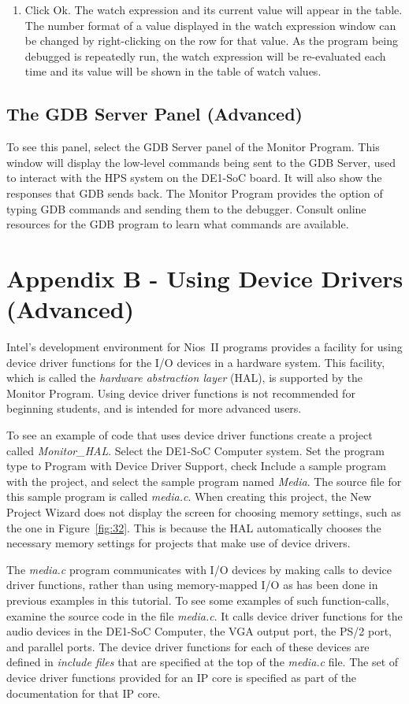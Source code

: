 \documentclass[11pt, twoside, pdftex]{article}
\begin{document}
\begin{enumerate}
\item Click \textsf{Ok}. The watch expression and its current
value will appear in the table. The number format of a value
displayed in the watch expression window can be changed by
right-clicking on the row for that value.  
As the program being debugged is repeatedly run, 
the watch expression will be re-evaluated each time and its value
will be shown in the table of watch values.
\end{enumerate}

\subsection{The GDB Server Panel (Advanced)}
To see this panel, select the {\sf GDB Server} panel of the
Monitor Program. This window will display the low-level commands
being sent to the GDB Server, used to interact with the HPS
system on the DE1-SoC board. It will also show the responses that GDB sends back. The Monitor Program provides the option
of typing GDB commands and sending them to the debugger. 
Consult online resources for the GDB program to learn what
commands are available.

\newpage
\section{Appendix B - Using Device Drivers (Advanced)}
Intel's development environment for Nios~II programs provides a
facility for using device driver functions for the I/O devices in
a hardware system. This facility, which is called the
{\it hardware abstraction layer} (HAL), is supported by the
Monitor Program. Using device driver functions is not recommended
for beginning students, and is intended for more advanced users. 

To see an example of code that uses device driver functions
create a project called {\it Monitor\_HAL}. 
Select the DE1-SoC Computer system. Set the program type to 
{\sf Program with Device Driver Support}, 
check {\sf Include a sample program with the project}, 
and select the sample program named {\it Media}. The source file
for this sample program is called {\it media.c}.
When creating this project, the New Project Wizard does not
display the screen for choosing memory settings, such as the one in Figure~\ref{fig:32}. This is because the HAL automatically chooses 
the necessary memory settings for projects that make use of device drivers.

The {\it media.c} program communicates with I/O devices by making
calls to device driver functions, rather than using memory-mapped
I/O as has been done in previous examples in this tutorial.  
To see some examples of such function-calls, examine the source
code in the file {\it media.c}. It calls device driver functions
for the audio devices in the DE1-SoC Computer, the VGA output
port, the PS/2 port, and parallel ports. The device driver
functions for each of these devices are defined in 
{\it include files} that are specified at the top of the
{\it media.c} file. The set of device driver functions
provided for an IP core is specified as part of the documentation
for that IP core.
\end{document}
